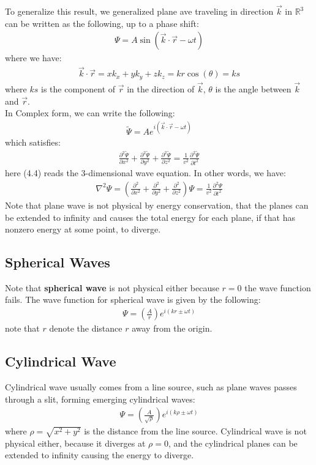 \documentclass[11pt]{book}
\theoremstyle{break}
\theoremstyle{break}
\newcommand{\R}{\mathbb{R}}
\newcommand{\that}[1]{\widetilde{#1}}
\begin{document}
To generalize this result, we generalized plane ave traveling in direction $\vec{k}$ in $\R^3$ can be written as the following, up to a phase shift:
\begin{align*}
\Psi = A \sin(\vec{k}\cdot \vec{r} - \omega t)
\end{align*}
where we have:
\begin{align*}
\vec{k}\cdot \vec{r} = x k_x + yk_y + zk_z = k r\cos(\theta) = ks
\end{align*}
where $ks $ is the component of $\vec{r}$ in the direction of $\vec{k}$, $\theta$ is the angle between $\vec{k}$ and $\vec{r}$. \\

In Complex form, we can write the following:
\begin{align*}
\that{\Psi} = Ae^{i(\vec{k}\cdot \vec{r} - \omega t)}
\end{align*}
which satisfies:
\begin{align}
\frac{\partial^2 \that{\Psi}}{\partial x^2} + \frac{\partial^2 \that{\Psi}}{\partial y^2} + \frac{\partial^2 \that{\Psi}}{\partial z^2} = \frac{1}{v^2} \frac{\partial^2 \that{\Psi}}{\partial t^2}
\end{align}
here (4.4) reads the $3$-dimensional wave equation. In other words, we have:
\begin{align*}
\nabla^2 \Psi = \left(\frac{\partial^2}{\partial x^2}+\frac{\partial^2}{\partial y^2}+\frac{\partial^2}{\partial z^2} \right) \Psi= \frac{1}{v^2} \frac{\partial^2 \Psi}{\partial t^2}
\end{align*}
Note that plane wave is not physical by energy conservation, that the planes can be extended to infinity and causes the total energy for each plane, if that has nonzero energy at some point, to diverge. 


\subsection{Spherical Waves}
Note that \textbf{spherical wave} is not physical either because $r=0$ the wave function fails. The wave function for spherical wave is given by the following:
\begin{align*}
\Psi = \left( \frac{A}{r}\right) e^{i(kr \pm \omega t)}
\end{align*}
note that $r$ denote the distance $r$ away from the origin. 

\subsection{Cylindrical Wave}
Cylindrical wave usually comes from a line source, such as plane waves passes through a slit, forming emerging cylindrical waves:
\begin{align*}
\Psi = \left(\frac{A}{\sqrt{\rho}}\right) e^{i(k\rho \pm \omega t)}
\end{align*}
where $\rho = \sqrt{x^2 + y^2}$ is the distance from the line source. Cylindrical wave is not physical either, because it diverges at $\rho=0$, and the cylindrical planes can be extended to infinity causing the energy to diverge.\\
\end{document}
